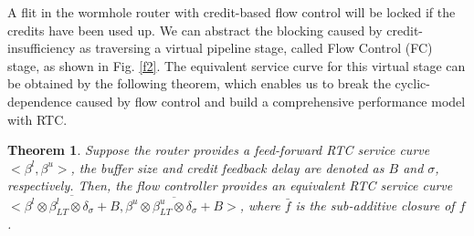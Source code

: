 \documentclass[10pt,journal]{IEEEtran}
\newtheorem{theorem}{Theorem}
\begin{document}
A flit in the wormhole router with credit-based flow control will be locked if the credits have been used up. We can abstract the blocking caused by credit-insufficiency as traversing a virtual pipeline stage, called Flow Control (FC) stage, as shown in Fig. \ref{f2}. The equivalent service curve for this virtual stage can be obtained by the following theorem, which enables us to break the cyclic-dependence caused by flow control and build a comprehensive performance model with RTC.
\begin{theorem}\label{credit}
Suppose the router provides a feed-forward RTC service curve $<\beta^l,\beta^u>$, the buffer size and credit feedback delay are denoted as $B$ and $\sigma$, respectively. Then, the flow controller provides an equivalent RTC service curve $<\overline{\beta^l\otimes\beta_{LT}^l\otimes\delta_{\sigma}+B},\overline{\beta^u\otimes\beta_{LT}^u\otimes\delta_{\sigma}+B}>$, where $\bar{f}$ is the sub-additive closure \cite{Boudec2001Network} of $f$.
\end{theorem}
\end{document}
